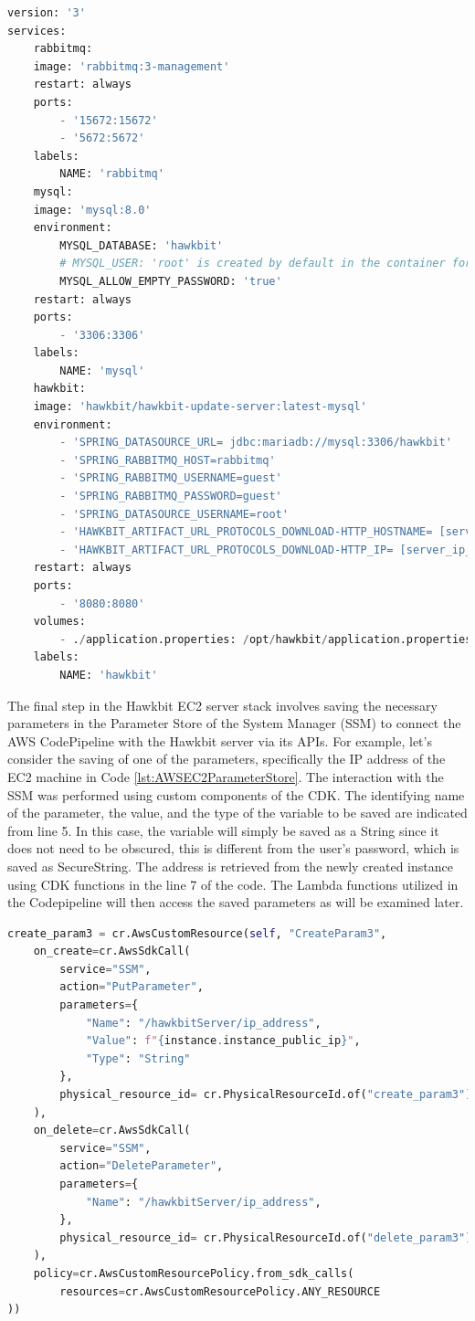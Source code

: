 \begin{lstlisting}[language=Python, caption={Hawkbit server Docker compose}, label=lst:AWSEC2DockerCompose]
version: '3'
services:
    rabbitmq:
    image: 'rabbitmq:3-management'
    restart: always
    ports:
        - '15672:15672'
        - '5672:5672'
    labels:
        NAME: 'rabbitmq'
    mysql:
    image: 'mysql:8.0'
    environment:
        MYSQL_DATABASE: 'hawkbit'
        # MYSQL_USER: 'root' is created by default in the container for mysql 8.0+
        MYSQL_ALLOW_EMPTY_PASSWORD: 'true'
    restart: always
    ports:
        - '3306:3306'
    labels:
        NAME: 'mysql'
    hawkbit:
    image: 'hawkbit/hawkbit-update-server:latest-mysql'
    environment:
        - 'SPRING_DATASOURCE_URL= jdbc:mariadb://mysql:3306/hawkbit'
        - 'SPRING_RABBITMQ_HOST=rabbitmq'
        - 'SPRING_RABBITMQ_USERNAME=guest'
        - 'SPRING_RABBITMQ_PASSWORD=guest'
        - 'SPRING_DATASOURCE_USERNAME=root'
        - 'HAWKBIT_ARTIFACT_URL_PROTOCOLS_DOWNLOAD-HTTP_HOSTNAME= [server_ip_address]'
        - 'HAWKBIT_ARTIFACT_URL_PROTOCOLS_DOWNLOAD-HTTP_IP= [server_ip_address]'
    restart: always
    ports:
        - '8080:8080'
    volumes:
        - ./application.properties: /opt/hawkbit/application.properties
    labels:
        NAME: 'hawkbit'
    \end{lstlisting}

The final step in the Hawkbit EC2 server stack involves saving the necessary parameters in the Parameter Store of the System Manager (SSM) to connect the AWS CodePipeline with the Hawkbit server via its APIs. For example, let's consider the saving of one of the parameters, specifically the IP address of the EC2 machine in Code \ref{lst:AWSEC2ParameterStore}. The interaction with the SSM was performed using custom components of the CDK. The identifying name of the parameter, the value, and the type of the variable to be saved are indicated from line 5. In this case, the variable will simply be saved as a String since it does not need to be obscured, this is different from the user's password, which is saved as SecureString. The address is retrieved from the newly created instance using CDK functions in the line 7 of the code. The Lambda functions utilized in the Codepipeline will then access the saved parameters as will be examined later.
\begin{lstlisting}[language=Python, caption={Hawkbit server Docker compose}, label=lst:AWSEC2ParameterStore]
    create_param3 = cr.AwsCustomResource(self, "CreateParam3",
    on_create=cr.AwsSdkCall(
        service="SSM",
        action="PutParameter",
        parameters={
            "Name": "/hawkbitServer/ip_address",
            "Value": f"{instance.instance_public_ip}",
            "Type": "String"
        },
        physical_resource_id= cr.PhysicalResourceId.of("create_param3")
    ),
    on_delete=cr.AwsSdkCall(
        service="SSM",
        action="DeleteParameter",
        parameters={
            "Name": "/hawkbitServer/ip_address",
        },
        physical_resource_id= cr.PhysicalResourceId.of("delete_param3")
    ),
    policy=cr.AwsCustomResourcePolicy.from_sdk_calls(
        resources=cr.AwsCustomResourcePolicy.ANY_RESOURCE
))
\end{lstlisting}

